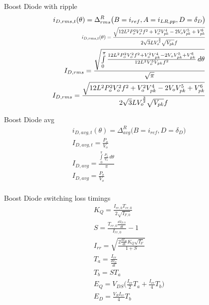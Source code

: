 \documentclass[12pt]{report}
\begin{document}
Boost Diode with ripple
\begin{align}
i_{D,rms,t}(\theta) = \Delta^R_{rms} \big(B=i_{ref},A=i_{LR,pp},D=\delta_{D} \big)\\
\text{\scalebox{0.75}{$i_{D,rms,t}(\theta) = \frac{\sqrt{12 L^{2} P_{o}^{2} V_{o}^{2} f^{2} + V_{o}^{2} V_{pk}^{4} - 2 V_{o} V_{pk}^{5} + V_{pk}^{6}}}{2 \sqrt{3} L V_{o}^{\frac{3}{2}} \sqrt{V_{pk}} f}$}}\\
I_{D,rms} = \frac{\sqrt{\int\limits_{0}^{\pi} \frac{12 L^{2} P_{o}^{2} V_{o}^{2} f^{2} + V_{o}^{2} V_{pk}^{4} - 2 V_{o} V_{pk}^{5} + V_{pk}^{6}}{12 L^{2} V_{o}^{3} V_{pk} f^{2}}\, d\theta}}{\sqrt{\pi}}\\
I_{D,rms} = \frac{\sqrt{12 L^{2} P_{o}^{2} V_{o}^{2} f^{2} + V_{o}^{2} V_{pk}^{4} - 2 V_{o} V_{pk}^{5} + V_{pk}^{6}}}{2 \sqrt{3} L V_{o}^{\frac{3}{2}} \sqrt{V_{pk}} f}\\
\end{align}

Boost Diode avg
\begin{align}
i_{D,avg,t}(\theta) = \Delta^R_{avg} \big(B=i_{ref}, D=\delta_{D} \big)\\
I_{D,avg,t} = \frac{P_{o}}{V_{o}}\\
I_{D,avg} = \frac{\int\limits_{0}^{\pi} \frac{P_{o}}{V_{o}}\, d\theta}{\pi}\\
I_{D,avg} = \frac{P_{o}}{V_{o}}\\
\end{align}

Boost Diode switching loss timings
\begin{align}
K_{Q} = \frac{I_{rr,0}T_{rr,0}}{2\sqrt{I_{F,0}}}\\
S = \frac{T_{rr,0}\frac{dI_{D,0}}{dt}}{I_{rr,0}} - 1\\
I_{rr} = \sqrt{\frac{2\frac{dI_{D}}{dt}K_{Q}\sqrt{I_{F}}}{1+S}}\\
T_{a} = \frac{I_{rr}}{\frac{dI_{D}}{dt}}\\
T_{b} = ST_{a}\\
E_{Q} = V_{DS}\big(\frac{I_{rr}}{2}T_{a}+\frac{I_{rr}}{4}T_{b}\big)\\
E_{D} = \frac{V_{R}I_{rr}}{4}T_{b}\\
\end{align}
\end{document}
